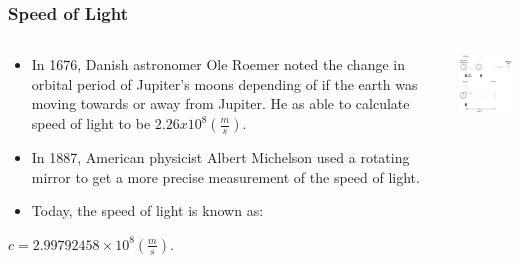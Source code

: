 \documentclass{beamer}
\begin{document}
\begin{frame}\frametitle{Speed of Light}
\begin{columns}
\begin{column}{7cm}
\begin{itemize}
\item In 1676, Danish astronomer Ole Roemer noted the change in orbital period of Jupiter's moons depending of if the earth was moving towards or away from Jupiter. He as able to calculate speed of light to be $2.26 x 10^8 (\frac{m}{s})$.
\item In 1887, American physicist Albert Michelson used a rotating mirror to get a more precise measurement of the speed of light. 
\item Today, the speed of light is known as:
\end{itemize}
\begin{center}
$c=2.99792458×10^8 (\frac{m}{s})$.
\end{center}

\end{column}
\begin{column}{5cm}
\begin{center}
\includegraphics[width=4.5cm]{fig/c_meas.png}
\end{center}
\end{column}
\end{columns}
\end{frame}
\end{document}
